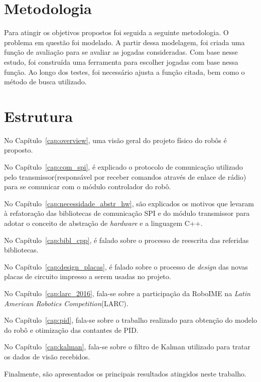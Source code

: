 \section{Metodologia}

Para atingir os objetivos propostos foi seguida a seguinte metodologia.
O problema em questão foi modelado. A partir dessa modelagem, foi
criada uma função de avaliação para se avaliar as jogadas consideradas.
Com base nesse estudo, foi construída uma ferramenta para escolher
jogadas com base nessa função. Ao longo dos testes, foi necessário
ajusta a função citada, bem como o método de busca utilizado.

\section{Estrutura}

%
%
%
%
%
%

No Capítulo~\ref{cap:overview}, uma visão geral do projeto físico do robôs é proposto.

No Capítulo~\ref{cap:com_spi}, é explicado o protocolo de comunicação utilizado pelo transmissor(responsável por receber comandos através de enlace de rádio) para se comunicar com o módulo controlador do robô.

No Capítulo~\ref{cap:necessidade_abstr_hw}, são explicados os motivos que levaram à refatoração das bibliotecas de comunicação SPI e do módulo transmissor para adotar o conceito de abstração de \textit{hardware} e a linguagem C++. 

No Capítulo~\ref{cap:bibl_cpp}, é falado sobre o processo de reescrita das referidas bibliotecas.

No Capítulo~\ref{cap:design_placas}, é falado sobre o processo de \textit{design} das novas placas de circuito impresso a serem usadas no projeto.

No Capítulo~\ref{cap:larc_2016}, fala-se sobre a participação da RoboIME na \textit{Latin American Robotics Competition}(LARC).

No Capítulo~\ref{cap:pid}, fala-se sobre o trabalho realizado para obtenção do modelo do robô e otimização das contantes de PID.

No Capítulo~\ref{cap:kalman}, fala-se sobre o filtro de Kalman utilizado para tratar os dados de visão recebidos.


Finalmente, são apresentados os principais resultados atingidos neste trabalho.

